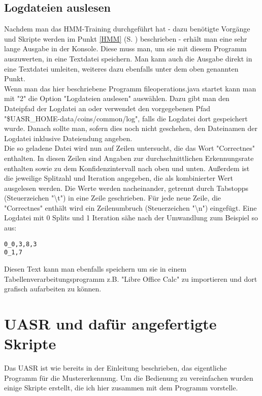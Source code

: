 \subsection{Logdateien auslesen}

Nachdem man das HMM-Training durchgeführt hat - dazu benötigte Vorgänge und Skripte werden im Punkt \ref{HMM}  (S. \pageref{HMM}) beschrieben - erhält man eine sehr lange Ausgabe in der Konsole. Diese muss man, um sie mit diesem Programm auszuwerten, in eine Textdatei speichern. Man kann auch die Ausgabe direkt in eine Textdatei umleiten, weiteres dazu ebenfalls unter dem oben genannten Punkt. \\
Wenn man das hier beschriebene Programm fileoperations.java startet kann man mit "2" die Option "Logdateien auslesen" auswählen. Dazu gibt man den Dateipfad der Logdatei an oder verwendet den vorgegebenen Pfad "\$UASR\_HOME-data/coins/common/log", falls die Logdatei dort gespeichert wurde. Danach sollte man, sofern dies noch nicht geschehen, den Dateinamen der Logdatei inklusive Dateiendung angeben. \\
Die so geladene Datei wird nun auf Zeilen untersucht, die das Wort "Correctnes" enthalten. In diesen Zeilen sind Angaben zur durchschnittlichen Erkennungsrate enthalten sowie zu dem Konfidenzintervall nach oben und unten. Außerdem ist die jeweilige Splitzahl und Iteration angegeben, die als kombinierter Wert ausgelesen werden. Die Werte werden nacheinander, getrennt durch Tabstopps (Steuerzeichen "\textbackslash t") in eine Zeile geschrieben. Für jede neue Zeile, die "Correctnes" enthält wird ein Zeilenumbruch (Steuerzeichen "\textbackslash n") eingefügt.
Eine Logdatei mit 0 Splits und 1 Iteration sähe nach der Umwandlung zum Beispiel so aus:
\begin{bsp}
\texttt{0\_0,3,8,3 \\
	    0\_1,7\; \;
}
\end{bsp}
Diesen Text kann man ebenfalls speichern um sie in einem Tabellenverarbeitungsprogramm z.B. "Libre Office Calc" zu importieren und dort grafisch aufarbeiten zu können.

\newpage
\section{UASR und dafür angefertigte Skripte}

Das UASR ist wie bereits in der Einleitung beschrieben, das eigentliche Programm für die Mustererkennung. Um die Bedienung zu vereinfachen wurden einige Skripte erstellt, die ich hier zusammen mit dem Programm vorstelle.

